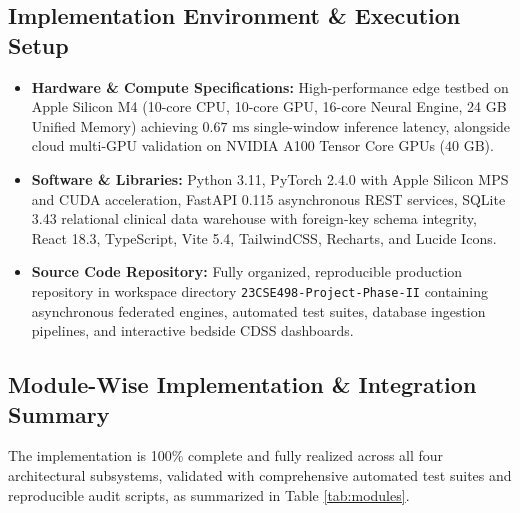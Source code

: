 \documentclass[11pt, a4paper]{article}
\begin{document}
\subsection{Implementation Environment \& Execution Setup}
\begin{itemize}[noitemsep, topsep=2pt]
    \item \textbf{Hardware \& Compute Specifications:} High-performance edge testbed on Apple Silicon M4 (10-core CPU, 10-core GPU, 16-core Neural Engine, 24 GB Unified Memory) achieving $0.67\text{ ms}$ single-window inference latency, alongside cloud multi-GPU validation on NVIDIA A100 Tensor Core GPUs ($40\text{ GB}$).
    \item \textbf{Software \& Libraries:} Python 3.11, PyTorch 2.4.0 with Apple Silicon MPS and CUDA acceleration, FastAPI 0.115 asynchronous REST services, SQLite 3.43 relational clinical data warehouse with foreign-key schema integrity, React 18.3, TypeScript, Vite 5.4, TailwindCSS, Recharts, and Lucide Icons.
    \item \textbf{Source Code Repository:} Fully organized, reproducible production repository in workspace directory \texttt{23CSE498\allowbreak-Project\allowbreak-Phase-II} containing asynchronous federated engines, automated test suites, database ingestion pipelines, and interactive bedside CDSS dashboards.
\end{itemize}

\subsection{Module-Wise Implementation \& Integration Summary}
\noindent
The implementation is 100\% complete and fully realized across all four architectural subsystems, validated with comprehensive automated test suites and reproducible audit scripts, as summarized in Table \ref{tab:modules}.
\end{document}
